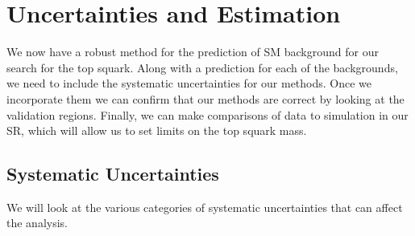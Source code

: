 \chapter{Uncertainties and Estimation}
\label{ch:UncertandEst}

We now have a robust method for the prediction of SM background for our search for the top squark. Along with a prediction for each of the backgrounds, we need to include the systematic uncertainties for our methods. Once we incorporate them we can confirm that our methods are correct by looking at the validation regions. Finally, we can make comparisons of data to simulation in our SR, which will allow us to set limits on the top squark mass. 

\section{Systematic Uncertainties}\label{sec:Uncert}
We will look at the various categories of systematic uncertainties that can affect the analysis. 
